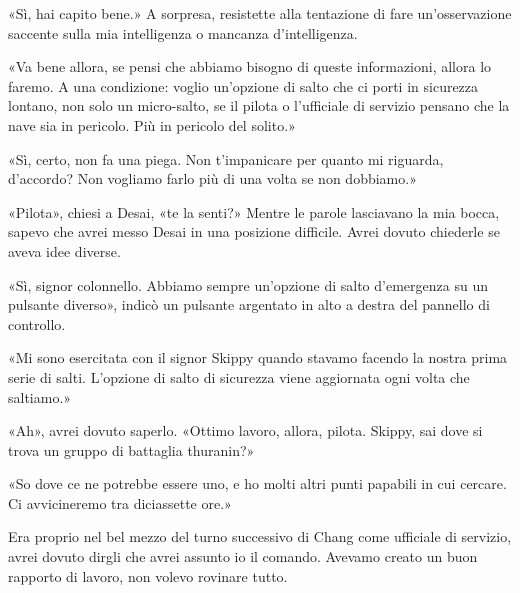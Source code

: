 «Sì, hai capito bene.» A sorpresa, resistette alla tentazione di fare
un'osservazione saccente sulla mia intelligenza o mancanza
d'intelligenza.

«Va bene allora, se pensi che abbiamo bisogno di queste informazioni,
allora lo faremo. A una condizione: voglio un'opzione di salto che ci
porti in sicurezza lontano, non solo un micro-salto, se il pilota o
l'ufficiale di servizio pensano che la nave sia in pericolo. Più in
pericolo del solito.»

«Sì, certo, non fa una piega. Non t'impanicare per quanto mi riguarda,
d'accordo? Non vogliamo farlo più di una volta se non dobbiamo.»

«Pilota», chiesi a Desai, «te la senti?» Mentre le parole lasciavano la
mia bocca, sapevo che avrei messo Desai in una posizione difficile.
Avrei dovuto chiederle se aveva idee diverse.

«Sì, signor colonnello. Abbiamo sempre un'opzione di salto d'emergenza
su un pulsante diverso», indicò un pulsante argentato in alto a destra
del pannello di controllo.

«Mi sono esercitata con il signor Skippy quando stavamo facendo la
nostra prima serie di salti. L'opzione di salto di sicurezza viene
aggiornata ogni volta che saltiamo.»

«Ah», avrei dovuto saperlo. «Ottimo lavoro, allora, pilota. Skippy, sai
dove si trova un gruppo di battaglia thuranin?»

«So dove ce ne potrebbe essere uno, e ho molti altri punti papabili in
cui cercare. Ci avvicineremo tra diciassette ore.»

Era proprio nel bel mezzo del turno successivo di Chang come ufficiale
di servizio, avrei dovuto dirgli che avrei assunto io il comando.
Avevamo creato un buon rapporto di lavoro, non volevo rovinare tutto.

\hfill\break

